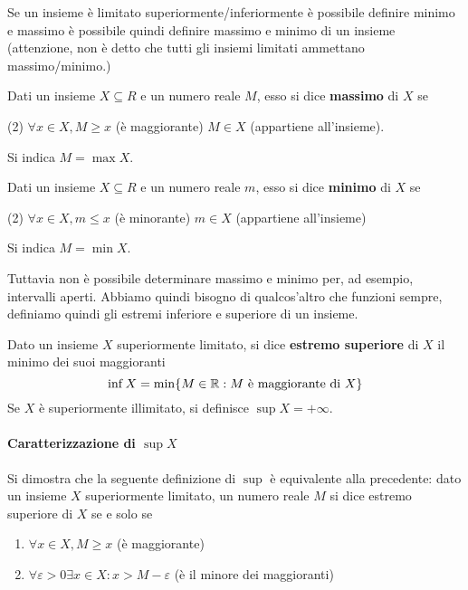 Se un insieme è limitato superiormente/inferiormente è possibile definire minimo e massimo è possibile quindi definire massimo e minimo di un insieme (attenzione, non è detto che tutti gli insiemi limitati ammettano massimo/minimo.)
\begin{boxdef}[Massimo]
    Dati un insieme $X\subseteq R$ e un numero reale $M$, esso si dice \textbf{massimo} di $X$ se 
    \begin{tasks}[label={\roman*)}](2)
        \task $\forall x\in X, M\geq x $ (è maggiorante)
        \task $M\in X$ (appartiene all'insieme).
    \end{tasks}
    Si indica $M=\max X$.
\end{boxdef}
\begin{boxdef}[Minimo]
    Dati un insieme $X\subseteq R$ e un numero reale $m$, esso si dice \textbf{minimo} di $X$ se 
    \begin{tasks}[label={\roman*)}](2)
        \task $\forall x\in X, m\leq x $ (è minorante)
        \task $m\in X$ (appartiene all'insieme)
    \end{tasks}
    Si indica $M=\min X$.
\end{boxdef}
Tuttavia non è possibile determinare massimo e minimo per, ad esempio, intervalli aperti. Abbiamo quindi bisogno di qualcos'altro che funzioni sempre, definiamo quindi gli estremi inferiore e superiore di un insieme.

\begin{boxdef}
    Dato un insieme $X$ superiormente limitato, si dice \textbf{estremo superiore} di $X$ il minimo dei suoi maggioranti
    \[\inf X = \min\{M\in \mathbb{R} : M \text{ è maggiorante di }X\}\]
    Se $X$ è superiormente illimitato, si definisce $\sup X = +\infty$.
\end{boxdef}
\paragraph{Caratterizzazione di $\sup X$}
Si dimostra che la seguente definizione di $\sup$ è equivalente alla precedente: dato un insieme $X$ superiormente limitato, un numero reale $M$ si dice estremo superiore di $X$ se e solo se 
\begin{enumerate}[label={\roman*)}]
    \item $\forall x\in X, M\geq x $ (è maggiorante)
    \item $\forall \varepsilon >0 \exists x\in X: x>M-\varepsilon$ (è il minore dei maggioranti)
\end{enumerate}

